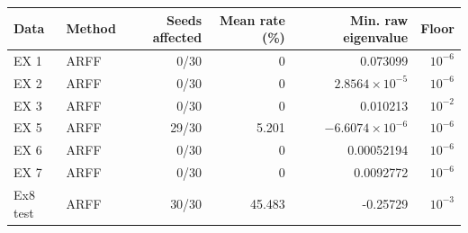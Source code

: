 \begin{tabular}{llrrrr}\toprule Data & Method & Seeds affected & Mean rate (\%) & Min. raw eigenvalue & Floor\\\midrule
EX 1 & ARFF & 0/30 & 0 & 0.073099 & $10^{-6}$\\
EX 2 & ARFF & 0/30 & 0 & $2.8564\times10^{-5}$ & $10^{-6}$\\
EX 3 & ARFF & 0/30 & 0 & 0.010213 & $10^{-2}$\\
EX 5 & ARFF & 29/30 & 5.201 & $-6.6074\times10^{-6}$ & $10^{-6}$\\
EX 6 & ARFF & 0/30 & 0 & 0.00052194 & $10^{-6}$\\
EX 7 & ARFF & 0/30 & 0 & 0.0092772 & $10^{-6}$\\
Ex8 test & ARFF & 30/30 & 45.483 & -0.25729 & $10^{-3}$\\
\bottomrule\end{tabular}
